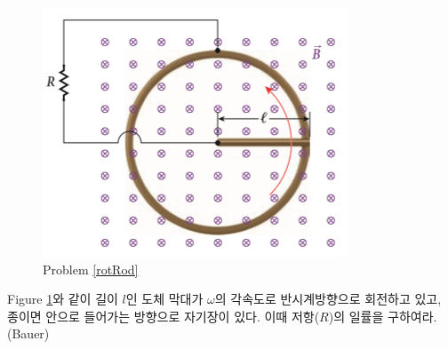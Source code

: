 \begin{problem}\label{rotRod}
\begin{figure}[h]
\centering\includegraphics[scale=0.5]{Pictures/rotRod.PNG}
\caption{Problem \ref{rotRod}}
\label{fig:rotRod}
\end{figure}

Figure \ref{fig:rotRod}와 같이 길이 $l$인 도체 막대가 $\omega$의 각속도로 반시계방향으로 회전하고 있고, 종이면 안으로 들어가는 방향으로 자기장이 있다. 이때 저항($R$)의 일률을 구하여라. (Bauer)

\end{problem}




